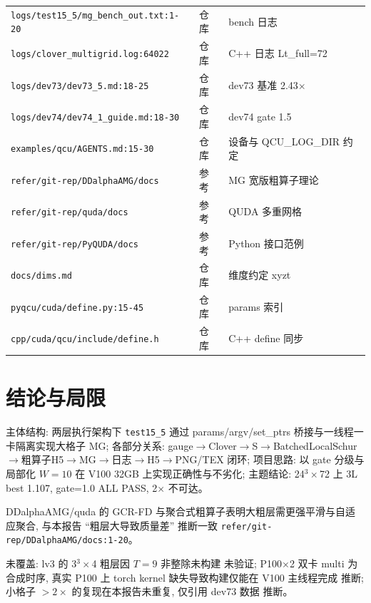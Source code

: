\documentclass[UTF8]{ctexart}
\begin{document}
\begin{xltabular}{\textwidth}{llX}
\texttt{\nolinkurl{logs/test15_5/mg_bench_out.txt:1-20}} & 仓库 & bench 日志 \\
\texttt{\nolinkurl{logs/clover_multigrid.log:64022}} & 仓库 & C++ 日志 Lt\_full=72 \\
\texttt{\nolinkurl{logs/dev73/dev73_5.md:18-25}} & 仓库 & dev73 基准 2.43$\times$ \\
\texttt{\nolinkurl{logs/dev74/dev74_1_guide.md:18-30}} & 仓库 & dev74 gate 1.5 \\
\texttt{\nolinkurl{examples/qcu/AGENTS.md:15-30}} & 仓库 & 设备与 QCU\_LOG\_DIR 约定 \\
\texttt{\nolinkurl{refer/git-rep/DDalphaAMG/docs}} & 参考 & MG 宽版粗算子理论 \\
\texttt{\nolinkurl{refer/git-rep/quda/docs}} & 参考 & QUDA 多重网格 \\
\texttt{\nolinkurl{refer/git-rep/PyQUDA/docs}} & 参考 & Python 接口范例 \\
\texttt{\nolinkurl{docs/dims.md}} & 仓库 & 维度约定 xyzt \\
\texttt{\nolinkurl{pyqcu/cuda/define.py:15-45}} & 仓库 & params 索引 \\
\texttt{\nolinkurl{cpp/cuda/qcu/include/define.h}} & 仓库 & C++ define 同步 \\
\bottomrule
\end{xltabular}

\section{结论与局限}
\begin{conclbox}
主体结构: 两层执行架构下 \texttt{\nolinkurl{test15_5}} 通过 params/argv/set\_ptrs 桥接与一线程一卡隔离实现大格子 MG; 各部分关系: gauge$\to$Clover$\to$S$\to$BatchedLocalSchur$\to$粗算子H5$\to$MG$\to$日志$\to$H5$\to$PNG/TEX 闭环; 项目思路: 以 gate 分级与局部化 $W=10$ 在 V100 32GB 上实现正确性与不劣化; 主题结论: 24$^3\times$72 上 3L best 1.107, gate=1.0 ALL PASS, 2$\times$ 不可达。
\end{conclbox}
\begin{refbox}
DDalphaAMG/quda 的 GCR-FD 与聚合式粗算子表明大粗层需更强平滑与自适应聚合, 与本报告 ``粗层大导致质量差'' 推断一致 \textcolor{evidence}{\texttt{\nolinkurl{refer/git-rep/DDalphaAMG/docs:1-20}}}。
\end{refbox}
\begin{warnbox}
未覆盖: lv3 的 3$^3\times$4 粗层因 $T=9$ 非整除未构建 \textcolor{warn}{未验证}; P100$\times$2 双卡 multi 为合成时序, 真实 P100 上 torch kernel 缺失导致构建仅能在 V100 主线程完成 \textcolor{warn}{推断}; 小格子 $>2\times$ 的复现在本报告未重复, 仅引用 dev73 数据 \textcolor{warn}{推断}。
\end{warnbox}
\end{document}
